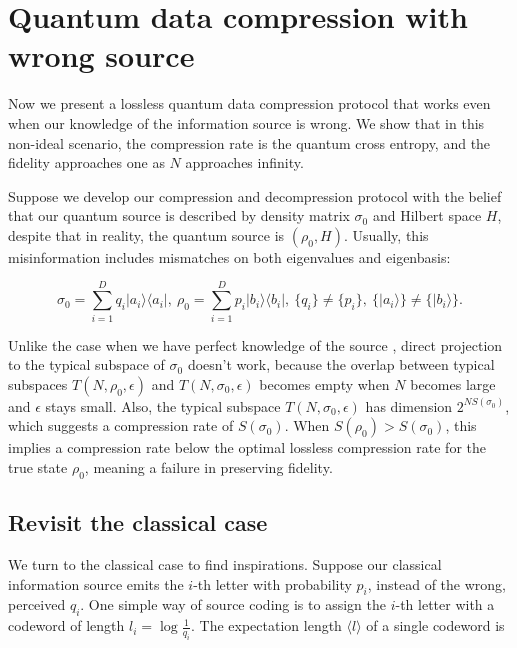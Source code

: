 \documentclass[11pt]{article}
\begin{document}
\section{Quantum data compression with wrong source}
\label{wrong}

Now we present a lossless quantum data compression protocol that works even when our knowledge of the information source is wrong. We show that in this non-ideal scenario, the compression rate is the quantum cross entropy, and the fidelity approaches one as $N$ approaches infinity. 

Suppose we develop our compression and decompression protocol with the belief that our quantum source is described by density matrix $\sigma_0$ and Hilbert space $H$, despite that in reality, the quantum source is $(\rho_0, H)$. Usually, this misinformation includes mismatches on both eigenvalues and eigenbasis:

\begin{equation}
    \sigma_0 = \sum_{i=1}^D q_i |a_i\rangle \langle a_i|, \ 
    \rho_0 = \sum_{i=1}^D p_i |b_i\rangle \langle b_i|, \  
    \{q_i\} \neq \{p_i\}, \ \{|a_i\rangle \} \neq \{|b_i\rangle\}.
\end{equation}

Unlike the case when we have perfect knowledge of the source \cite{qcoding, NielsenChuang}, direct projection to the typical subspace of $\sigma_0$ doesn't work, because the overlap between typical subspaces $T(N, \rho_0, \epsilon)$ and $T(N, \sigma_0, \epsilon)$ becomes empty when $N$ becomes large and $\epsilon$ stays small. Also, the typical subspace $T(N, \sigma_0, \epsilon)$ has dimension $2^{N S(\sigma_0)}$, 
which suggests a compression rate of $S(\sigma_0)$. 
When $S(\rho_0) > S(\sigma_0)$, this implies a compression rate below the optimal lossless compression rate for the true state $\rho_0$, meaning a failure in preserving fidelity.

\subsection{Revisit the classical case}


We turn to the classical case to find inspirations. Suppose our classical information source emits the $i$-th letter with probability $p_i$, instead of the wrong, perceived $q_i$. One simple way of source coding is to assign the $i$-th letter with a codeword of length $l_i = \log \frac{1}{q_i}$. The expectation length $\langle l \rangle$ of a single codeword is
\end{document}
